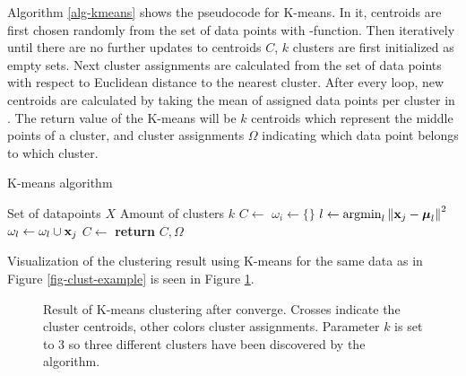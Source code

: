 Algorithm \ref{alg-kmeans} shows the pseudocode for K-means. In it, centroids are first chosen randomly from the set of data points with -function. Then iteratively until there are no further updates to centroids $C$, $k$ clusters are first initialized as empty sets. Next cluster assignments are calculated from the set of data points with respect to Euclidean distance to the nearest cluster. After every loop, new centroids are calculated by taking the mean of assigned data points per cluster in . The return value of the K-means will be $k$ centroids which represent the middle points of a cluster, and cluster assignments $\Omega$ indicating which data point belongs to which cluster.

\clearpage

\begin{algorithm}[ht]
\caption{K-means algorithm \cite{Manning:2008:IIR:1394399}}
\label{alg-kmeans}
\begin{algorithmic}

\Require Set of datapoints $X$
\Require Amount of clusters $k$
   \State $C  \leftarrow $ 
            \State $\omega_i \gets \{\} $
       \EndFor
            \State $l \gets \operatorname*{argmin}_{l} \left\lVert\mathbf{x}_j - \boldsymbol{\mu}_l\right\rVert^2$
            \State $\omega_l \gets \omega_l \cup \mathbf{x}_j$
        \EndFor
       \State $C \gets $ 
   \EndWhile
\State \textbf{return} $C, \Omega$
\EndProcedure

\end{algorithmic}
\end{algorithm}

\noindent 
Visualization of the clustering result using K-means for the same data as in Figure \ref{fig-clust-example} is seen in Figure \ref{fig-kmeans-example}.

\begin{figure}[!h]
\centering
\setlength\figureheight{7cm}
\setlength\figurewidth{7cm}

\caption{Result of K-means clustering after converge. Crosses indicate the cluster centroids, other colors cluster assignments. Parameter $k$ is set to 3 so three different clusters have been discovered by the algorithm.} \label{fig-kmeans-example}
\end{figure}


